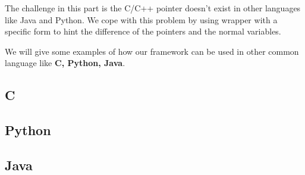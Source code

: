 	The challenge in this part is the C/C++ pointer doesn’t exist in other languages like Java and Python. We cope with this problem by using wrapper with a specific form to hint the difference of the pointers and the normal variables.
  
  We will give some examples of how our framework can be used in other common language like \textbf{C, Python, Java}.
  
\subsection{C}

\subsection{Python}

\subsection{Java}

